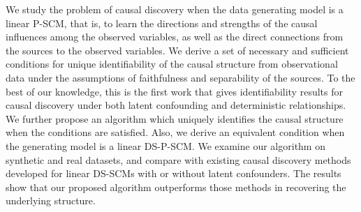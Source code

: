 \documentclass[12pt]{article}
\begin{document}

We study the problem of causal discovery when the data generating model is a linear P-SCM, that is, to learn the directions and strengths of the causal influences among the observed variables, as well as the direct connections from the sources to the observed variables. We derive a set of necessary and sufficient conditions for unique identifiability of the causal structure from observational data under the assumptions of faithfulness and separability of the sources.
To the best of our knowledge, this is the first work that gives identifiability results for causal discovery under both latent confounding and deterministic relationships.
We further propose an algorithm which uniquely identifies the causal structure when the conditions are satisfied. Also, we derive an equivalent condition when the generating model is a linear DS-P-SCM.
We examine our algorithm on synthetic and real datasets, and compare with existing causal discovery methods developed for linear DS-SCMs with or without latent confounders. The results show that our proposed algorithm outperforms those methods in recovering the underlying structure.%
\end{document}
